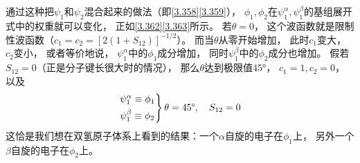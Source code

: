 通过这种把$\psi_1$和$\psi_2$混合起来的做法（即\autoref{3.358}\autoref{3.359}），
$\phi_1,\phi_2$在$\psi_1^\alpha,\psi_1^\beta$的基组展开式中的权重就可以变化，
正如\autoref{3.362}\autoref{3.363}所示。
若$\theta=0$，
这个波函数就是限制性波函数（$c_1=c_2=[2(1+S_{12} )]^{-1/2}$）。
而当$\theta$从零开始增加，
此时$c_1$变大，
$c_2$变小，
或者等价地说，
$\psi_1^\alpha$中的$\phi_1$成分增加，
同时$\psi_1^\beta$中的$\phi_2$成分也增加。
假若$S_{12}=0$（正是分子键长很大时的情况），
那么$\theta$达到极限值$45\text{°}$，
$c_1=1,c_2=0$，
以及
\begin{align}
	\begin{rcases*}
		\psi_1^\alpha \equiv \phi_1\\
		\psi_1^\beta \equiv \phi_2
	\end{rcases*}\theta = 45\text{°},\quad S_{12}=0
\end{align}
这恰是我们想在双氢原子体系上看到的结果：一个$\alpha$自旋的电子在$\phi_1$上，
另外一个$\beta$自旋的电子在$\phi_2$上。









\theendnotes
